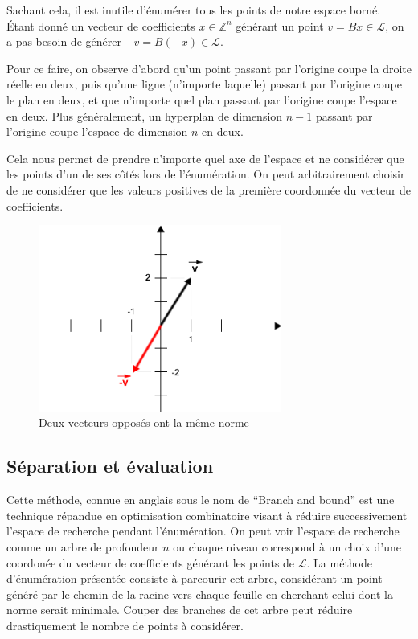 \documentclass{article}
\begin{document}
Sachant cela, il est inutile d'énumérer tous les points de notre espace borné. Étant donné un vecteur de coefficients $x \in \mathbb{Z}^n$ générant un point $v = Bx \in \mathcal{L}$, on a pas besoin de générer $-v = B(-x) \in \mathcal{L}$.

Pour ce faire, on observe d'abord qu'un point passant par l'origine coupe la droite réelle en deux, puis qu'une ligne (n'importe laquelle) passant par l'origine coupe le plan en deux, et que n'importe quel plan passant par l'origine coupe l'espace en deux. Plus généralement, un hyperplan de dimension $n-1$ passant par l'origine coupe l'espace de dimension $n$ en deux.

Cela nous permet de prendre n'importe quel axe de l'espace et ne considérer que les points d'un de ses côtés lors de l'énumération. On peut arbitrairement choisir de ne considérer que les valeurs positives de la première coordonnée du vecteur de coefficients.

\begin{figure}[h]
    \caption{Deux vecteurs opposés ont la même norme}
    \includegraphics[width=8cm]{symm.png}
    \centering
\end{figure}

\subsection{Séparation et évaluation}

Cette méthode, connue en anglais sous le nom de ``Branch and bound'' est une technique répandue en optimisation combinatoire visant à réduire successivement l'espace de recherche pendant l'énumération. On peut voir l'espace de recherche comme un arbre de profondeur $n$ ou chaque niveau correspond à un choix d'une coordonée du vecteur de coefficients générant les points de $\mathcal{L}$. La méthode d'énumération présentée consiste à parcourir cet arbre, considérant un point généré par le chemin de la racine vers chaque feuille en cherchant celui dont la norme serait minimale. Couper des branches de cet arbre peut réduire drastiquement le nombre de points à considérer.
\end{document}

